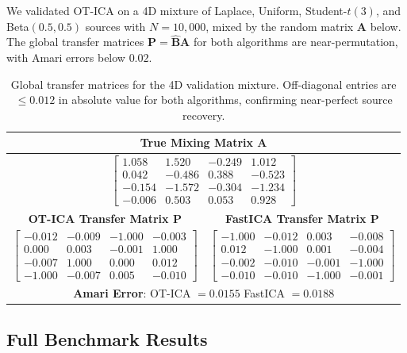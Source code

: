 \documentclass{tpm2026} %
\begin{document}
We validated OT-ICA on a 4D mixture of Laplace, Uniform, Student-$t(3)$, and Beta$(0.5, 0.5)$ sources with $N=10{,}000$, mixed by the random matrix $\mathbf{A}$ below. The global transfer matrices $\mathbf{P} = \hat{\mathbf{B}}\mathbf{A}$ for both algorithms are near-permutation, with Amari errors below $0.02$.

\begin{table}[htbp]
\centering
\small
\begin{tabular}{cc}
\toprule
\multicolumn{2}{c}{\textbf{True Mixing Matrix $\mathbf{A}$}} \\
\midrule
\multicolumn{2}{c}{$\begin{bmatrix}
 1.058 &  1.520 & -0.249 &  1.012 \\
 0.042 & -0.486 &  0.388 & -0.523 \\
-0.154 & -1.572 & -0.304 & -1.234 \\
-0.006 &  0.503 &  0.053 &  0.928
\end{bmatrix}$} \\
\midrule
\textbf{OT-ICA Transfer Matrix $\mathbf{P}$} & \textbf{FastICA Transfer Matrix $\mathbf{P}$} \\
\midrule
$\begin{bmatrix}
-0.012 & -0.009 & -1.000 & -0.003 \\
 0.000 &  0.003 & -0.001 &  1.000 \\
-0.007 &  1.000 &  0.000 &  0.012 \\
-1.000 & -0.007 &  0.005 & -0.010
\end{bmatrix}$
&
$\begin{bmatrix}
-1.000 & -0.012 &  0.003 & -0.008 \\
 0.012 & -1.000 &  0.001 & -0.004 \\
-0.002 & -0.010 & -0.001 & -1.000 \\
-0.010 & -0.010 & -1.000 & -0.001
\end{bmatrix}$ \\
\midrule
\multicolumn{2}{c}{\textbf{Amari Error}: OT-ICA $= 0.0155$ \quad FastICA $= 0.0188$} \\
\bottomrule
\end{tabular}
\caption{Global transfer matrices for the 4D validation mixture. Off-diagonal entries are $\leq 0.012$ in absolute value for both algorithms, confirming near-perfect source recovery.}
\label{tab:baseline_matrices}
\end{table}

\subsection{Full Benchmark Results}
\label{app:full_results}
\end{document}
